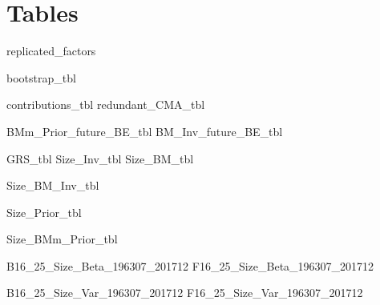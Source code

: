 
\section{Tables} \label{sec:tables}


{replicated_factors}

\begin{landscape}
{bootstrap_tbl}
\end{landscape}
{contributions_tbl}
{redundant_CMA_tbl}

{BMm_Prior_future_BE_tbl}
{BM_Inv_future_BE_tbl}

{GRS_tbl}
{Size_Inv_tbl}
{Size_BM_tbl}
\begin{landscape}
{Size_BM_Inv_tbl}
\end{landscape}
{Size_Prior_tbl}
\begin{landscape}
{Size_BMm_Prior_tbl}
\end{landscape}


{B16_25_Size_Beta_196307_201712}
{F16_25_Size_Beta_196307_201712}


{B16_25_Size_Var_196307_201712}
{F16_25_Size_Var_196307_201712}

